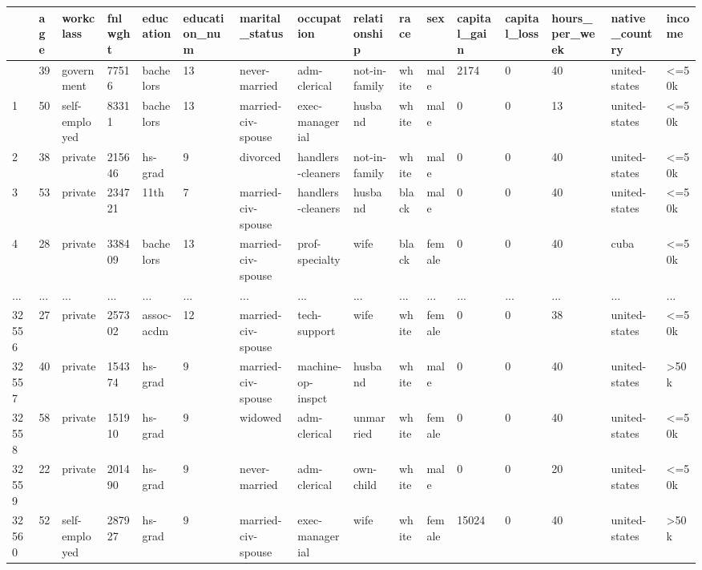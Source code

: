 \documentclass[
  letterpaper,
  DIV=11,
  numbers=noendperiod]{scrartcl}
\begin{document}
\begin{longtable}[]{@{}llllllllllllllll@{}}
\toprule\noalign{}
& age & workclass & fnlwght & education & education\_num &
marital\_status & occupation & relationship & race & sex & capital\_gain
& capital\_loss & hours\_per\_week & native\_country & income \\
\midrule\noalign{}
\endhead
\bottomrule\noalign{}
\endlastfoot
0 & 39 & government & 77516 & bachelors & 13 & never-married &
adm-clerical & not-in-family & white & male & 2174 & 0 & 40 &
united-states & \textless=50k \\
1 & 50 & self-employed & 83311 & bachelors & 13 & married-civ-spouse &
exec-managerial & husband & white & male & 0 & 0 & 13 & united-states &
\textless=50k \\
2 & 38 & private & 215646 & hs-grad & 9 & divorced & handlers-cleaners &
not-in-family & white & male & 0 & 0 & 40 & united-states &
\textless=50k \\
3 & 53 & private & 234721 & 11th & 7 & married-civ-spouse &
handlers-cleaners & husband & black & male & 0 & 0 & 40 & united-states
& \textless=50k \\
4 & 28 & private & 338409 & bachelors & 13 & married-civ-spouse &
prof-specialty & wife & black & female & 0 & 0 & 40 & cuba &
\textless=50k \\
... & ... & ... & ... & ... & ... & ... & ... & ... & ... & ... & ... &
... & ... & ... & ... \\
32556 & 27 & private & 257302 & assoc-acdm & 12 & married-civ-spouse &
tech-support & wife & white & female & 0 & 0 & 38 & united-states &
\textless=50k \\
32557 & 40 & private & 154374 & hs-grad & 9 & married-civ-spouse &
machine-op-inspct & husband & white & male & 0 & 0 & 40 & united-states
& \textgreater50k \\
32558 & 58 & private & 151910 & hs-grad & 9 & widowed & adm-clerical &
unmarried & white & female & 0 & 0 & 40 & united-states &
\textless=50k \\
32559 & 22 & private & 201490 & hs-grad & 9 & never-married &
adm-clerical & own-child & white & male & 0 & 0 & 20 & united-states &
\textless=50k \\
32560 & 52 & self-employed & 287927 & hs-grad & 9 & married-civ-spouse &
exec-managerial & wife & white & female & 15024 & 0 & 40 & united-states
& \textgreater50k \\
\end{longtable}
\end{document}
